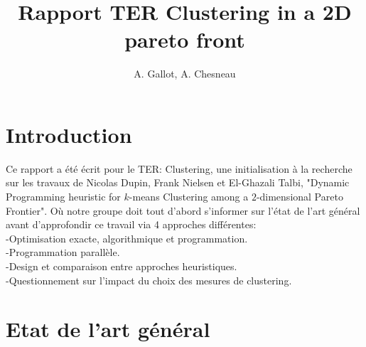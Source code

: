 ﻿\documentclass{meta}
\begin{document}
\title{Rapport TER Clustering in a 2D pareto front}

\author{A. Gallot, A. Chesneau}



\maketitle

\section{Introduction}

Ce rapport a été écrit pour le TER: Clustering, une initialisation à la recherche sur les travaux de Nicolas Dupin, Frank Nielsen et El-Ghazali Talbi, "Dynamic Programming heuristic for $k$-means Clustering among a $2$-dimensional Pareto Frontier".
Où notre groupe doit tout d'abord s'informer sur l'état de l'art général avant d'approfondir ce travail via 4 approches différentes:\\
-Optimisation exacte, algorithmique et programmation.\\
-Programmation parallèle.\\
-Design et comparaison entre approches heuristiques.\\
-Questionnement sur l’impact du choix des mesures de clustering.

\section{Etat de l'art général}
\end{document}
